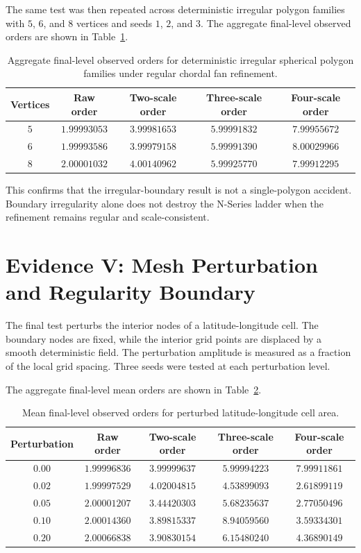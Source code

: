 \documentclass[11pt]{article}
\begin{document}
The same test was then repeated across deterministic irregular polygon
families with $5$, $6$, and $8$ vertices and seeds $1$, $2$, and $3$.  The
aggregate final-level observed orders are shown in
Table~\ref{tab:batch-irregular-polygon-orders}.

\begin{table}[ht]
\centering
\small
\begin{tabular}{ccccc}
\toprule
Vertices & Raw order & Two-scale order & Three-scale order & Four-scale order \\
\midrule
$5$ & $1.99993053$ & $3.99981653$ & $5.99991832$ & $7.99955672$ \\
$6$ & $1.99993586$ & $3.99979158$ & $5.99991390$ & $8.00029966$ \\
$8$ & $2.00001032$ & $4.00140962$ & $5.99925770$ & $7.99912295$ \\
\bottomrule
\end{tabular}
\caption{Aggregate final-level observed orders for deterministic irregular
spherical polygon families under regular chordal fan refinement.}
\label{tab:batch-irregular-polygon-orders}
\end{table}

This confirms that the irregular-boundary result is not a single-polygon
accident.  Boundary irregularity alone does not destroy the N-Series ladder
when the refinement remains regular and scale-consistent.

\section{Evidence V: Mesh Perturbation and Regularity Boundary}

The final test perturbs the interior nodes of a latitude-longitude cell.  The
boundary nodes are fixed, while the interior grid points are displaced by a
smooth deterministic field.  The perturbation amplitude is measured as a
fraction of the local grid spacing.  Three seeds were tested at each
perturbation level.

The aggregate final-level mean orders are shown in
Table~\ref{tab:perturb-orders}.

\begin{table}[ht]
\centering
\small
\begin{tabular}{ccccc}
\toprule
Perturbation & Raw order & Two-scale order & Three-scale order & Four-scale order \\
\midrule
$0.00$ & $1.99996836$ & $3.99999637$ & $5.99994223$ & $7.99911861$ \\
$0.02$ & $1.99997529$ & $4.02004815$ & $4.53899093$ & $2.61899119$ \\
$0.05$ & $2.00001207$ & $3.44420303$ & $5.68235637$ & $2.77050496$ \\
$0.10$ & $2.00014360$ & $3.89815337$ & $8.94059560$ & $3.59334301$ \\
$0.20$ & $2.00066838$ & $3.90830154$ & $6.15480240$ & $4.36890149$ \\
\bottomrule
\end{tabular}
\caption{Mean final-level observed orders for perturbed latitude-longitude
cell area.}
\label{tab:perturb-orders}
\end{table}
\end{document}
